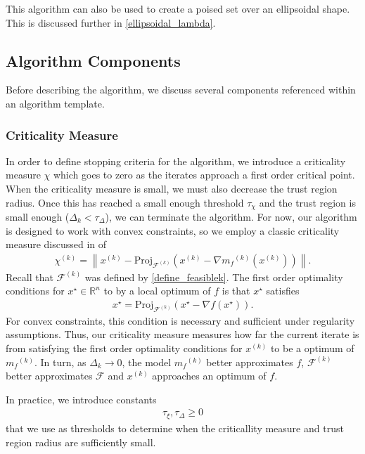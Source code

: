 \documentclass{article}
\theoremstyle{case}
\numberwithin{theorem}{subsection}
\newcommand{\chik}{{\chi^{(k)}}}
\newcommand{\dk}{\Delta_k}
\newcommand{\feasiblek}{{\mathcal F^{(k)}}}
\newcommand{\feasible}{{\mathcal F}}
\newcommand{\gradf}{\nabla f}
\newcommand{\mfk}{{{m}_f}^{(k)}}
\newcommand{\Rn}{\mathbb R^n}
\newcommand{\tolcrit}{\tau_{\xi}}
\newcommand{\tolrad}{\tau_{\Delta}}
\newcommand{\xk}{{x^{(k)}}}
\begin{document}
This algorithm can also be used to create a poised set over an ellipsoidal shape.
This is discussed further in \cref{ellipsoidal_lambda}.



\subsection{Algorithm Components}

Before describing the algorithm, we discuss several components referenced within an algorithm template.

\subsubsection{Criticality Measure}

In order to define stopping criteria for the algorithm, we introduce a criticality measure $\chi$ which goes to zero as the iterates approach a first order critical point.
When the criticality measure is small, we must also decrease the trust region radius.
Once this has reached a small enough threshold $\tau_{\chi}$ and the trust region is small enough ($\Delta_k < \tau_{\Delta}$), we can terminate the algorithm.
For now, our algorithm is designed to work with convex constraints, so we employ a classic criticality measure discussed in \cite{ConnGoulToin00} of
\begin{align}
\label{define_criticality_measure}
\chik = \left\|\xk - \text{Proj}_{\feasiblek}\left(\xk- \nabla \mfk\left(\xk\right)\right)\right\|.
\end{align}
Recall that $\feasiblek$ was defined by \cref{define_feasiblek}.
The first order optimality conditions for $x^{\star} \in \Rn$ to by a local optimum of $f$ is that $x^{\star}$ satisfies
\begin{align*}
x^{\star} = \text{Proj}_{\feasiblek}\left(x^{\star} - \gradf(x^{\star})\right).
\end{align*}
For convex constraints, this condition is necessary and sufficient under regularity assumptions.
Thus, our criticality measure measures how far the current iterate is from satisfying the first order optimality conditions for $\xk$ to be a optimum of $\mfk$.
In turn, as $\dk \to 0$, the model $\mfk$ better approximates $f$, $\feasiblek$ better approximates $\feasible$ and $\xk$ approaches an optimum of $f$.

In practice, we introduce constants 
\begin{align}
            \tolcrit, \tolrad \ge 0 \label{define_algorithm_tolerances}
\end{align}
that we use as thresholds to determine when the criticallity measure and trust region radius are sufficiently small.
\end{document}
